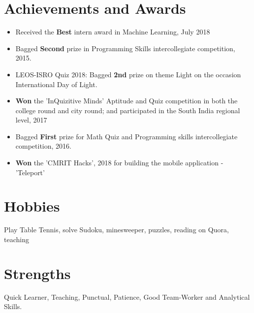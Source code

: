 \documentclass[margin, centered]{res}
\begin{document}
\begin{resume}
\section{Achievements and Awards}
\begin{itemize}[leftmargin=*]
 \item Received the \textbf{Best} intern award in Machine Learning, July 2018
 \item Bagged \textbf{Second} prize in Programming Skills intercollegiate competition, 2015.
 \item LEOS-ISRO Quiz 2018: Bagged \textbf{2nd} prize on theme Light on the occasion International
Day of Light.
 \item \textbf{Won} the ’InQuizitive Minds’ Aptitude and Quiz competition in both the college round and city round;
and participated in the South India regional level, 2017
 \item Bagged \textbf{First} prize for Math Quiz and Programming skills intercollegiate competition, 2016.
 \item \textbf{Won} the ’CMRIT Hacks’, 2018 for building the mobile application - ’Teleport’
\end{itemize}


\section{Hobbies}
Play Table Tennis, solve Sudoku, minesweeper, puzzles, reading on Quora, teaching

\section{Strengths}
Quick Learner, Teaching, Punctual, Patience, Good Team-Worker and Analytical Skills.

\end{resume}
\end{document}

